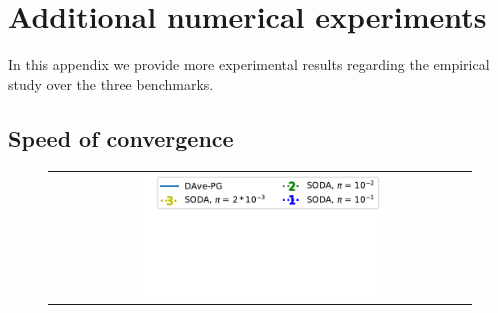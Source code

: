 \section{Additional numerical experiments}
In this appendix we provide more experimental results regarding the empirical study over the three benchmarks. 

\subsection{Speed of convergence}

\begin{figure}[h]
\vspace*{-20pt}
\begin{center}
\begin{tabular}{c}
 \includegraphics[width=0.6\textwidth]{SODA/Figs/madelon_legend.pdf}\vspace*{-100pt}
\end{tabular}
\end{center}
 \hfill

\end{figure}
